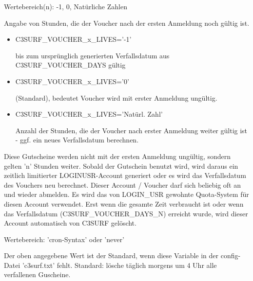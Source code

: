 \begin{description}

   
   
   Wertebereich(n): -1, 0, Natürliche Zahlen
   
  Angabe von Stunden, die der Voucher nach der ersten Anmeldung noch gültig ist.


\begin{itemize}
   \item{C3SURF\_VOUCHER\_x\_LIVES='-1'} 
         
         bis zum ursprünglich generierten Verfallsdatum aus C3SURF\_VOUCHER\_DAYS gültig
   \item{C3SURF\_VOUCHER\_x\_LIVES='0'}
         
         (Standard), bedeutet Voucher wird mit erster Anmeldung ungültig.
    \item{C3SURF\_VOUCHER\_x\_LIVES='Natürl. Zahl'}
          
          Anzahl der Stunden, die der Voucher nach erster Anmeldung weiter gültig ist - ggf. ein neues
          Verfallsdatum berechnen.
\end{itemize}
\parskip 12pt

  Diese Gutscheine werden nicht mit der ersten Anmeldung ungültig, sondern gelten 'n' Stunden
  weiter. Sobald der Gutschein benutzt wird, wird daraus ein zeitlich limitierter LOGINUSR-Account generiert
  oder es wird das Verfallsdatum des Vouchers neu berechnet. Dieser Account / Voucher darf sich beliebig oft
  an und wieder abmelden. Es wird das von LOGIN\_USR gewohnte Quota-System für diesen Account verwendet. Erst
  wenn die gesamte Zeit verbraucht ist oder wenn das Verfallsdatum (C3SURF\_VOUCHER\_DAYS\_N) erreicht wurde,
  wird dieser Account automatisch von C3SURF gelöscht.



    
   Wertebereich: 'cron-Syntax' oder 'never'
   
  Der oben angegebene Wert ist der Standard, wenn diese Variable in der config-Datei
  'c3surf.txt' fehlt.
  Standard: lösche täglich morgens um 4 Uhr alle verfallenen Guscheine.


\end{description}
